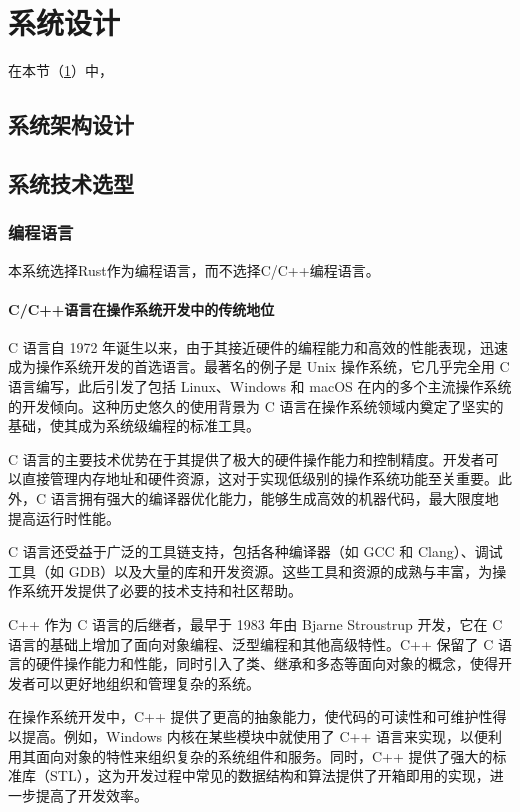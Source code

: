 \section{系统设计}\label{sec:SystemDesign}

在本节（\cref{sec:SystemDesign}）中，

\subsection{系统架构设计}

\subsection{系统技术选型}\label{sec:SystemTechnicalSelection}

\subsubsection{编程语言}

本系统选择Rust作为编程语言，而不选择C/C++编程语言。

\paragraph{C/C++语言在操作系统开发中的传统地位}

C 语言自 1972 年诞生以来，由于其接近硬件的编程能力和高效的性能表现，迅速成为操作系统开发的首选语言。最著名的例子是 Unix 操作系统，它几乎完全用 C 语言编写，此后引发了包括 Linux、Windows 和 macOS 在内的多个主流操作系统的开发倾向。这种历史悠久的使用背景为 C 语言在操作系统领域内奠定了坚实的基础，使其成为系统级编程的标准工具。

C 语言的主要技术优势在于其提供了极大的硬件操作能力和控制精度。开发者可以直接管理内存地址和硬件资源，这对于实现低级别的操作系统功能至关重要。此外，C 语言拥有强大的编译器优化能力，能够生成高效的机器代码，最大限度地提高运行时性能。

C 语言还受益于广泛的工具链支持，包括各种编译器（如 GCC 和 Clang）、调试工具（如 GDB）以及大量的库和开发资源。这些工具和资源的成熟与丰富，为操作系统开发提供了必要的技术支持和社区帮助。

C++ 作为 C 语言的后继者，最早于 1983 年由 Bjarne Stroustrup 开发，它在 C 语言的基础上增加了面向对象编程、泛型编程和其他高级特性。C++ 保留了 C 语言的硬件操作能力和性能，同时引入了类、继承和多态等面向对象的概念，使得开发者可以更好地组织和管理复杂的系统。

在操作系统开发中，C++ 提供了更高的抽象能力，使代码的可读性和可维护性得以提高。例如，Windows 内核在某些模块中就使用了 C++ 语言来实现，以便利用其面向对象的特性来组织复杂的系统组件和服务。同时，C++ 提供了强大的标准库（STL），这为开发过程中常见的数据结构和算法提供了开箱即用的实现，进一步提高了开发效率。

